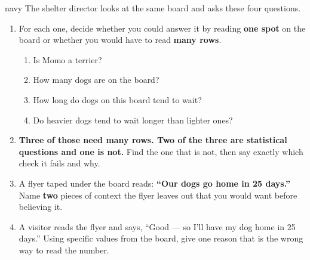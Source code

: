 \documentclass[10pt]{article}
\newcommand{\answerspace}[2]{\par\nopagebreak\noindent\begin{minipage}[t][#1][t]{\linewidth}%
  \color{keyred}\bfseries #2\end{minipage}\par}
\begin{document}
\vspace{0.10in}

\boxguard[26]
\begin{scenariobox}{navy}
\small
The shelter director looks at the same board and asks these four questions.

\vspace{4pt}
\begin{enumerate}[label=\textbf{\alph*.}, leftmargin=1.8em, itemsep=7pt]
  \item For each one, decide whether you could answer it by reading \textbf{one spot} on the
        board or whether you would have to read \textbf{many rows}.

        \begin{enumerate}[label=\textbf{(\Alph*)}, leftmargin=2.2em, itemsep=4pt]
          \item Is Momo a terrier? \hfill \blank{3.4cm}
          \item How many dogs are on the board? \hfill \blank{3.4cm}
          \item How long do dogs on this board tend to wait? \hfill \blank{3.4cm}
          \item Do heavier dogs tend to wait longer than lighter ones? \hfill \blank{3.4cm}
        \end{enumerate}
  \item \textbf{Three of those need many rows. Two of the three are statistical questions and
        one is not.} Find the one that is not, then say exactly which check it fails and why.
        \answerspace{2.4cm}{}
  \item A flyer taped under the board reads: \textbf{``Our dogs go home in 25 days.''}
        Name \textbf{two} pieces of context the flyer leaves out that you would want before
        believing it.
        \answerspace{1.8cm}{}
  \item A visitor reads the flyer and says, ``Good --- so I'll have my dog home in 25 days.''
        Using specific values from the board, give one reason that is the wrong way to read
        the number.
        \answerspace{1.8cm}{}
\end{enumerate}
\end{scenariobox}

\vspace{0.10in}
\end{document}
